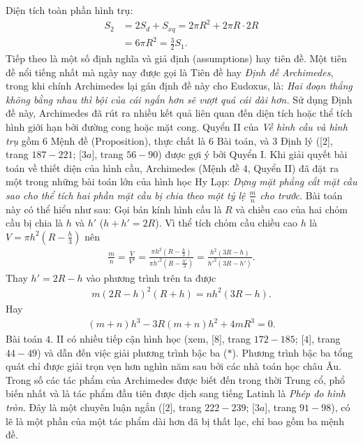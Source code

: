 \begin{multicols}{2}
	Diện tích toàn phần hình trụ: 
	\begin{align*}
		{S_2} &= 2{S_d} + {S_{xq}} = 2\pi {R^2} + 2\pi R\cdot2R \\
		&= 6\pi {R^2} = \frac{3}{2}{S_1}.
	\end{align*}
	Tiếp theo là một số định nghĩa và giả định (assumptions) hay tiên đề. Một tiên đề nổi tiếng nhất mà ngày nay được gọi là Tiên đề hay \textit{Định đề Archimedes}, trong khi chính Archimedes lại gán định đề này cho Eudoxus, là:  
	\vskip 0.1cm
	\textit{Hai đoạn thẳng không bằng nhau thì bội của cái ngắn hơn sẽ vượt quá cái dài hơn.}
	\vskip 0.1cm 
	Sử dụng Định đề này, Archimedes đã rút ra nhiều kết quả liên quan đến diện tích hoặc thể tích hình giới hạn bởi đường cong hoặc mặt cong.
	\vskip 0.1cm
	Quyển II của \textit{Về hình cầu và hình trụ} gồm $6$ Mệnh đề (Proposition), thực chất là $6$ Bài toán, và $3$ Định lý ([$2$], trang $187-221$; [$3a$], trang $56-90$) được gợi ý bởi Quyển I. Khi giải quyết bài toán về thiết diện của hình cầu, Archimedes (Mệnh đề $4$, Quyển II) đã đặt ra một trong những bài toán lớn của hình học Hy Lạp: 
	\vskip 0.1cm
	\textit{Dựng mặt phẳng cắt mặt cầu sao cho thể tích hai phần mặt cầu bị chia theo một tỷ lệ $\frac{m}{n}$ cho trước.} 
	\vskip 0.1cm
	Bài toán này có thể hiểu như sau: Gọi bán kính hình cầu là $R$  và chiều cao của hai chỏm cầu bị chia là $h$  và $h'$  ($h+ h'= 2R$). Vì thể tích chỏm cầu chiều cao $h$ là $V = \pi {h^2}\left( {R - \frac{h}{3}} \right)$  nên 
	\begin{align*}
		\frac{m}{n} = \frac{V}{{V'}} = \frac{{\pi {h^2}\left( {R - \frac{h}{3}} \right)}}{{\pi {{h'}^2}\left( {R - \frac{{h'}}{3}} \right)}} = \frac{{{h^2}\left( {3R - h} \right)}}{{{{h'}^2}\left( {3R - h'} \right)}}.
	\end{align*}
	Thay $h' = 2R - h$  vào phương trình trên ta được
	\begin{align*}
		m{\left( {2R - h} \right)^2}\left( {R + h} \right) = n{h^2}\left( {3R - h} \right).
	\end{align*}
	Hay 
	\begin{align*}
		\left( {m \!+\! n} \right){h^3} \!-\! 3R\left( {m \!+\! n} \right){h^2} \!+\! 4m{R^3} \!=\! 0. \tag{$*$}
	\end{align*}
	Bài toán $4.$ II có nhiều tiếp cận hình học (xem, [$8$], trang $172-185$; [$4$], trang $44-49$) và dẫn đến việc giải phương trình bậc ba ($*$). Phương trình bậc ba tổng quát chỉ được giải trọn vẹn hơn nghìn năm sau bởi các nhà toán học châu Âu.
	\vskip 0.1cm
	Trong số các tác phẩm của Archimedes được biết đến trong thời Trung cổ, phổ biến nhất và là tác phẩm đầu tiên được dịch sang tiếng Latinh là \textit{Phép đo hình tròn}. Đây là một chuyên luận ngắn ([$2$], trang $222-239$; [$3a$], trang $91-98$), có lẽ là một phần của một tác phẩm dài hơn đã bị thất lạc, chỉ bao gồm ba mệnh đề. 

\end{multicols}
